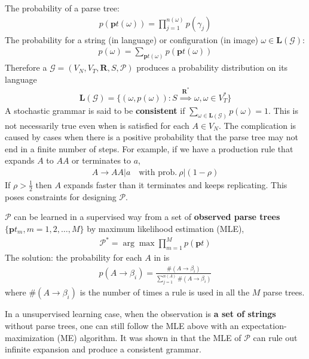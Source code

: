 \documentclass[../Notes_of_CaRiVaC.tex]{subfiles}
\begin{document}
The probability of a parse tree:
%
\begin{align}
  \label{eq:ii.1.9}
  \tag{1.9}
  p(\mathbf{p}t(\omega)) = \prod^{n(\omega)}_{j=1} p(\gamma_j)
\end{align}
%
The probability for a string (in language) or configuration (in image)
$\omega \in \mathbf{L}(\mathcal{G})$:
%
\begin{align}
  \label{eq:ii.1.10}
  \tag{1.10}
  p(\omega) = \sum_{\mathbf{p}t(\omega)} p(\mathbf{p}t(\omega))
\end{align}
%
Therefore a $\mathcal{G} = (V_N, V_T, \mathbf{R}, S, \mathcal{P})$ produces a
probability distribution on its language
%
\begin{align}
  \label{eq:ii.1.11}
  \tag{1.11}
  \mathbf{L}(\mathcal{G}) = \{(\omega, p(\omega)):
    S \overset{\mathbf{R^*}}{\implies} \omega, \omega \in V^*_T\}
\end{align}
%
A stochastic grammar is said to be \textbf{consistent} if
$\sum_{\omega \in \mathbf{L}(\mathcal{G})} p(\omega) = 1$. This is not
necessarily true even when  is satisfied for each $A \in V_N$. The
complication is caused by cases when there is a positive probability that the
parse tree may not end in a finite number of steps. For example, if we have a
production rule that expands $A$ to $AA$ or terminates to $a$,
%
\begin{align*}
  A \to AA \vert a \quad \text{with prob.}~\rho \vert (1 - \rho)
\end{align*}
%
If $\rho > \frac{1}{2}$ then $A$ expands faster than it terminates and keeps
replicating. This poses constraints for designing $\mathcal{P}$.

$\mathcal{P}$ can be learned in a supervised way from a set of
\textbf{observed parse trees} $\{\mathbf{p} t_m, m = 1, 2, \ldots, M\}$ by
maximum likelihood estimation (MLE),
%
\begin{align}
  \label{eq:ii.1.12}
  \tag{1.12}
  \mathcal{P^*} = \arg \max \prod^M_{m=1} p(\mathbf{p}t)
\end{align}
%
The solution: the probability for each $A$ in  is
%
\begin{align}
  \label{eq:ii.1.13}
  \tag{1.13}
  p(A \to \beta_i) = \frac{\#(A \to \beta_i)}{\sum^{n(A)}_{j=1} \#(A \to \beta_i)}
\end{align}
%
where $\#(A \to \beta_i)$ is the number of times a rule is used in all the $M$
parse trees.

In a unsupervised learning case, when the observation is
\textbf{a set of strings} without parse trees, one can still follow the MLE
above with an expectation-maximization (ME) algorithm. It was shown
in\cite{chi1998} that the MLE of $\mathcal{P}$ can rule out infinite expansion
and produce a consistent grammar.
\end{document}
